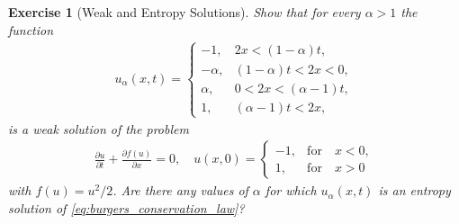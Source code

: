 \documentclass[10pt,letterpaper]{article}
\theoremstyle{break}
\newtheorem{exercise}{Exercise}
\begin{document}
\begin{exercise}[Weak and Entropy Solutions]
    Show that for every $\alpha>1$ the function
    \begin{align}
    	u_\alpha(x,t)
    	=
    	\left\{
        	\begin{array}{cl}
            	-1, & 2x<(1-\alpha) t, \\
            	-\alpha,& (1-\alpha)t<2x<0, \\
            	\alpha, & 0<2x<(\alpha-1)t, \\
            	1, & (\alpha-1) t< 2x,
    	    \end{array}
    	\right.
    \end{align}
    is a weak solution of the problem
    \begin{align}\label{eq:burgers_conservation_law}
    	\frac{\partial u}{\partial t}
    	+
    	\frac{\partial f(u) }{\partial x}
    	= 0,
    	\quad
    	u(x,0)
    	=
    	\left\{
        	\begin{array}{cl}
            	-1, & \text{for} \quad x<0,\\
            	1, &\text{for} \quad x>0
        	\end{array}
    	\right.
    \end{align}
    with $f(u) = u^2/2$.
    Are there any values of $\alpha$
    for which $u_\alpha(x,t)$ is an entropy solution
    of \eqref{eq:burgers_conservation_law}?
\end{exercise}
\end{document}
